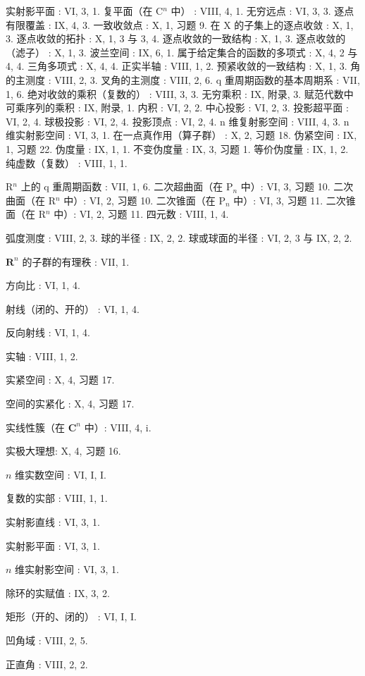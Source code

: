 实射影平面 : VI, 3, 1. 复平面（在 C\(^{n}\) 中） : VIII, 4, 1. 无穷远点 : VI, 3, 3. 逐点有限覆盖 : IX, 4, 3. 一致收敛点 : X, 1, 习题 9. 在 X 的子集上的逐点收敛 : X, 1, 3. 逐点收敛的拓扑 : X, 1, 3 与 3, 4. 逐点收敛的一致结构 : X, 1, 3. 逐点收敛的（滤子） : X, 1, 3. 波兰空间 : IX, 6, 1. 属于给定集合的函数的多项式 : X, 4, 2 与 4, 4. 三角多项式 : X, 4, 4. 正实半轴 : VIII, 1, 2. 预紧收敛的一致结构 : X, 1, 3. 角的主测度 : VIII, 2, 3. 叉角的主测度 : VIII, 2, 6. q 重周期函数的基本周期系 : VII, 1, 6. 绝对收敛的乘积（复数的） : VIII, 3, 3. 无穷乘积 : IX, 附录, 3. 赋范代数中可乘序列的乘积 : IX, 附录, 1. 内积 : VI, 2, 2. 中心投影 : VI, 2, 3. 投影超平面 : VI, 2, 4. 球极投影 : VI, 2, 4. 投影顶点 : VI, 2, 4. n 维复射影空间 : VIII, 4, 3. n 维实射影空间 : VI, 3, 1. 在一点真作用（算子群） : X, 2, 习题 18. 伪紧空间 : IX, 1, 习题 22. 伪度量 : IX, 1, 1. 不变伪度量 : IX, 3, 习题 1. 等价伪度量 : IX, 1, 2. 纯虚数（复数） : VIII, 1, 1.

R\(^{n}\) 上的 q 重周期函数 : VII, 1, 6. 二次超曲面（在 P\(_{n}\) 中）: VI, 3, 习题 10. 二次曲面（在 R\(^{n}\) 中）: VI, 2, 习题 10. 二次锥面（在 P\(_{n}\) 中）: VI, 3, 习题 11. 二次锥面（在 R\(^{n}\) 中）: VI, 2, 习题 11. 四元数 : VIII, 1, 4.

弧度测度 : VIII, 2, 3. 球的半径 : IX, 2, 2. 球或球面的半径 : VI, 2, 3 与 IX, 2, 2.

\(\mathbf{R}^n\) 的子群的有理秩 : VII, 1.

方向比 : VI, 1, 4.

射线（闭的、开的） : VI, 1, 4.

反向射线 : VI, 1, 4.

实轴 : VIII, 1, 2.

实紧空间 : X, 4, 习题 17.

空间的实紧化 : X, 4, 习题 17.

实线性簇（在 \(\mathbf{C}^n\) 中）: VIII, 4, i.

实极大理想: X, 4, 习题 16.

\(n\) 维实数空间 : VI, I, I.

复数的实部 : VIII, 1, 1.

实射影直线 : VI, 3, 1.

实射影平面 : VI, 3, 1.

\(n\) 维实射影空间 : VI, 3, 1.

除环的实赋值 : IX, 3, 2.

矩形（开的、闭的） : VI, I, I.

凹角域 : VIII, 2, 5.

正直角 : VIII, 2, 2.

